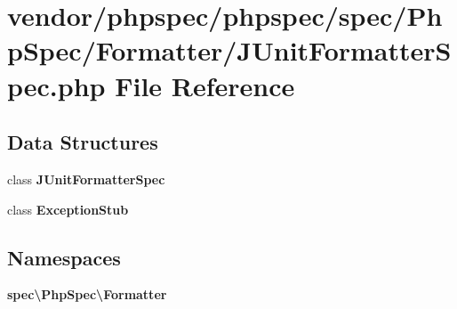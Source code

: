 \section{vendor/phpspec/phpspec/spec/\+Php\+Spec/\+Formatter/\+J\+Unit\+Formatter\+Spec.php File Reference}
\label{_j_unit_formatter_spec_8php}
\subsection*{Data Structures}
\begin{DoxyCompactItemize}
\item 
class {\bf J\+Unit\+Formatter\+Spec}
\item 
class {\bf Exception\+Stub}
\end{DoxyCompactItemize}
\subsection*{Namespaces}
\begin{DoxyCompactItemize}
\item 
 {\bf spec\textbackslash{}\+Php\+Spec\textbackslash{}\+Formatter}
\end{DoxyCompactItemize}

